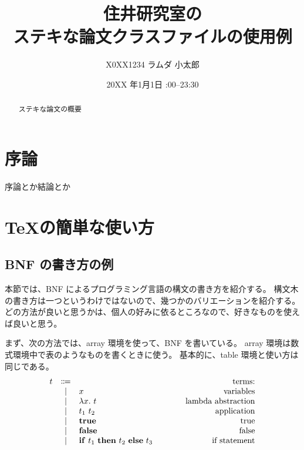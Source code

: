 \documentclass[uplatex]{sumiilab-paper}
\title{住井研究室の\\ステキな論文クラスファイルの使用例}
\author{X0XX1234 ラムダ 小太郎}
\institute{東北大学 工学部\\電気情報物理工学科}%
\date{20XX 年1月1日 \quad 23:00--23:30}
\theoremstyle{mystyle}
\numberwithin{definition}{chapter} %
\newcommand{\bkeyword}[1]{\ensuremath{\mathbf{#1}}}
\newcommand{\TRUE}{\bkeyword{true}}
\newcommand{\FALSE}{\bkeyword{false}}
\newcommand{\IF}{\bkeyword{if}}
\newcommand{\THEN}{\bkeyword{then}}
\newcommand{\ELSE}{\bkeyword{else}}
\begin{document}
\frontmatter%

\maketitle

\begin{abstract}
ステキな論文の概要
\end{abstract}

\tableofcontents%

\mainmatter%

\chapter{序論}

序論とか結論とか \cite{Pierce:TypeSystems}

\chapter{\TeX の簡単な使い方}

\section{BNF の書き方の例}

本節では、BNF によるプログラミング言語の構文の書き方を紹介する。
構文木の書き方は一つというわけではないので、幾つかのバリエーションを紹介する。
どの方法が良いと思うかは、個人の好みに依るところなので、好きなものを使えば良いと思う。

まず、次の方法では、array 環境を使って、BNF を書いている。
array 環境は数式環境中で表のようなものを書くときに使う。
基本的に、table 環境と使い方は同じである。
\[
\begin{array}{rcl@{\qquad\qquad}r}
  t & \Coloneqq & & \text{terms:} \\
  & \mid & x & \text{variables} \\
  & \mid & \lambda x.~t & \text{lambda abstraction} \\
  & \mid & t_1~t_2 & \text{application} \\
  & \mid & \TRUE & \text{true} \\
  & \mid & \FALSE & \text{false} \\
  & \mid & \IF~t_1~\THEN~t_2~\ELSE~t_3 & \text{if statement}
\end{array}
\]
\end{document}
